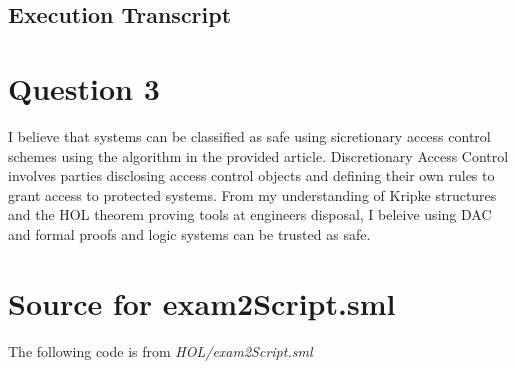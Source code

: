 \documentclass[11pt, twoside]{article}
\begin{document}
\subsection{Execution Transcript}
\label{sec:execution-transcript-4}



\newpage

\section{Question 3}
\label{sec:question-3}

I believe that systems can be classified as safe using sicretionary access 
control schemes using the algorithm in the provided article. Discretionary Access Control involves parties disclosing access control objects and defining their own rules to grant access to protected systems. From my understanding of Kripke structures and the HOL theorem proving tools at engineers disposal, I beleive using DAC and formal proofs and logic systems can be trusted as safe.

\HOLindex

\appendix{}

\section{Source for exam2Script.sml}
\label{sec:source-exam2scr}

The following code is from \emph{HOL/exam2Script.sml}

\end{document}
